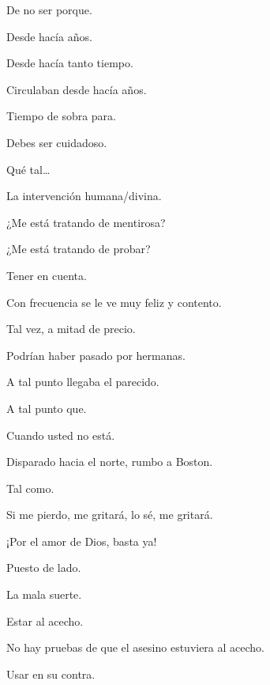 \sk
De no ser porque. 

\sk
Desde hacía años. 

\sk
Desde hacía tanto tiempo. 

\sk
Circulaban desde hacía años. 

\sk
Tiempo de sobra para. 

\sk
Debes ser cuidadoso. 

\sk
Qué tal\ldots{} 

\sk
La intervención humana/divina.\nb{}

\sk
¿Me está tratando de mentirosa? 

\sk
¿Me está tratando de probar? 

\sk
Tener en cuenta. 

\sk
Con frecuencia se le ve muy feliz y contento. 

\sk
Tal vez, a mitad de precio. 

\sk
Podrían haber pasado por hermanas. 

\sk
A tal punto llegaba el parecido. 

\sk
A tal punto que. 

\sk
Cuando usted no está. 

\sk
Disparado hacia el norte, rumbo a Boston. 

\sk
Tal como. 

\sk
Si me pierdo, me gritará, lo sé, me gritará. 

\sk
¡Por el amor de Dios, basta ya!\nb{}

\sk
Puesto de lado. 

\sk
La mala suerte. 

\sk
Estar al acecho. 

\sk
No hay pruebas de que el asesino estuviera al acecho. 

\sk
Usar en su contra. 

